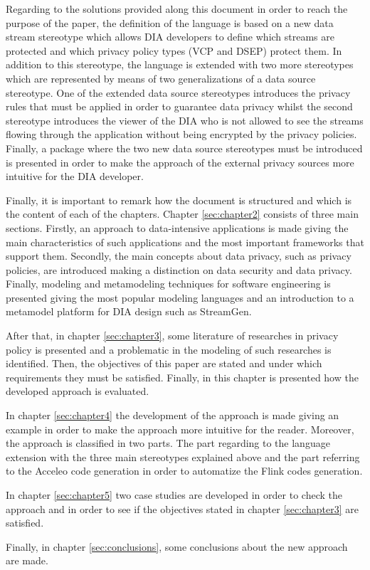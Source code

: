 Regarding to the solutions provided along this document in order to reach the purpose of the paper, the definition of the language is based on a new data stream stereotype which allows DIA developers to define which streams are protected and which privacy policy types (VCP and DSEP) protect them. In addition to this stereotype, the language is extended with two more stereotypes which are represented by means of two generalizations of a data source stereotype. One of the extended data source stereotypes introduces the privacy rules that must be applied in order to guarantee data privacy whilst the second stereotype introduces the viewer of the DIA who is not allowed to see the streams flowing through the application without being encrypted by the privacy policies. Finally, a package where the two new data source stereotypes must be introduced is presented in order to make the approach of the external privacy sources more intuitive for the DIA developer.

Finally, it is important to remark how the document is structured and which is the content of each of the chapters. Chapter \ref{sec:chapter2} consists of three main sections. Firstly, an approach to data-intensive applications is made giving the main characteristics of such applications and the most important frameworks that support them. Secondly, the main concepts about data privacy, such as privacy policies, are introduced making a distinction on data security and data privacy. Finally, modeling and metamodeling techniques for software engineering is presented giving the most popular modeling languages and an introduction to a metamodel platform for DIA design such as StreamGen.

After that, in chapter \ref{sec:chapter3}, some literature of researches in privacy policy is presented and a problematic in the modeling of such researches is identified. Then, the objectives of this paper are stated and under which requirements they must be satisfied. Finally, in this chapter is presented how the developed approach is evaluated.

In chapter \ref{sec:chapter4} the development of the approach is made giving an example in order to make the approach more intuitive for the reader. Moreover, the approach is classified in two parts. The part regarding to the language extension with the three main stereotypes explained above and the part referring to the Acceleo code generation in order to automatize the Flink codes generation.

In chapter \ref{sec:chapter5} two case studies are developed in order to check the approach and in order to see if the objectives stated in chapter \ref{sec:chapter3} are satisfied.

Finally, in chapter \ref{sec:conclusions}, some conclusions about the new approach are made.
